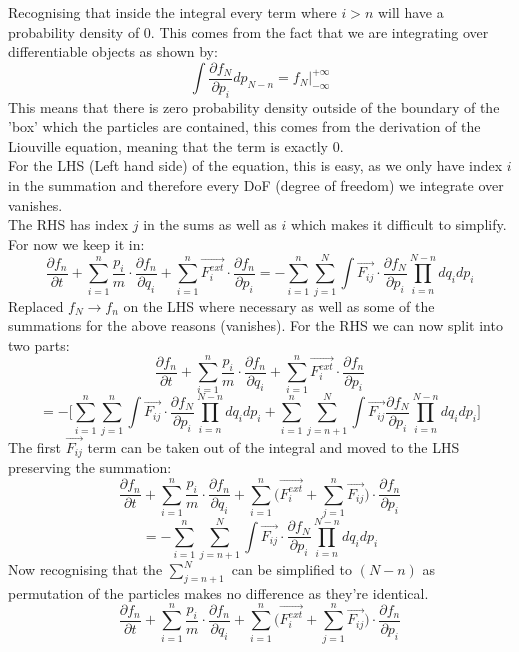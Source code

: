 \documentclass[12pt]{article}
\begin{document}
\begin{enumerate}
\begin{enumerate}
    Recognising that inside the integral every term where $i > n$ will have a probability density of 0. This comes from the fact that we are integrating over differentiable objects as shown by:
    $$ \int \frac{\partial f_N}{\partial p_i} dp_{N-n} = f_N \Big|_{-\infty}^{+\infty} $$
    This means that there is zero probability density outside of the boundary of the 'box' which the particles are contained, this comes from the derivation of the Liouville equation, meaning that the term is exactly 0. 
    \\
    For the LHS (Left hand side) of the equation, this is easy, as we only have index $i$ in the summation and therefore every DoF (degree of freedom) we integrate over vanishes. 
    \\ 
    The RHS has index $j$ in the sums as well as $i$ which makes it difficult to simplify. For now we keep it in:
    $$ \frac{\partial f_n}{\partial t} + \sum_{i=1}^n \frac{p_i}{m} \cdot \frac{\partial f_n}{\partial q_i} + \sum_{i=1}^n \vec{F_{i}^{ext}} \cdot \frac{\partial f_n}{\partial p_i} = - \sum_{i=1}^n \sum_{j=1}^N \int \vec{F_{ij}} \cdot \frac{\partial f_N}{\partial p_i} \prod_{i=n}^{N-n} dq_i dp_i $$
    Replaced $f_N \rightarrow f_n$ on the LHS where necessary as well as some of the summations for the above reasons (vanishes). For the RHS we can now split into two parts:
    $$ \frac{\partial f_n}{\partial t} + \sum_{i=1}^n \frac{p_i}{m} \cdot \frac{\partial f_n}{\partial q_i} + \sum_{i=1}^n \vec{F_{i}^{ext}} \cdot \frac{\partial f_n}{\partial p_i} $$
    $$ = - \Big[\sum_{i=1}^n \sum_{j=1}^n \int \vec{F_{ij}} \cdot \frac{\partial f_N}{\partial p_i} \prod_{i=n}^{N-n} dq_i dp_i + \sum_{i=1}^n \sum_{j=n+1}^N \int \vec{F_{ij}} \frac{\partial f_N}{\partial p_i} \prod_{i=n}^{N-n} dq_i dp_i \Big] $$
    The first $\vec{F_{ij}}$ term can be taken out of the integral and moved to the LHS preserving the summation:
    $$ \frac{\partial f_n}{\partial t} + \sum_{i=1}^n \frac{p_i}{m} \cdot \frac{\partial f_n}{\partial q_i} + \sum_{i=1}^n \Big(\vec{F_i^{ext}} + \sum_{j=1}^n \vec{F_{ij}}\Big) \cdot \frac{\partial f_n}{\partial p_i} $$
    $$ = - \sum_{i=1}^n \sum_{j=n+1}^N \int \vec{F_{ij}} \cdot \frac{\partial f_N}{\partial p_i} \prod_{i=n}^{N-n} dq_i dp_i $$
    Now recognising that the $\sum_{j=n+1}^N$ can be simplified to $(N-n)$ as permutation of the particles makes no difference as they're identical. 
    $$ \frac{\partial f_n}{\partial t} + \sum_{i=1}^n \frac{p_i}{m} \cdot \frac{\partial f_n}{\partial q_i} + \sum_{i=1}^n \Big(\vec{F_i^{ext}} + \sum_{j=1}^n \vec{F_{ij}}\Big) \cdot \frac{\partial f_n}{\partial p_i} $$ 

\end{enumerate}
\end{enumerate}
\end{document}
